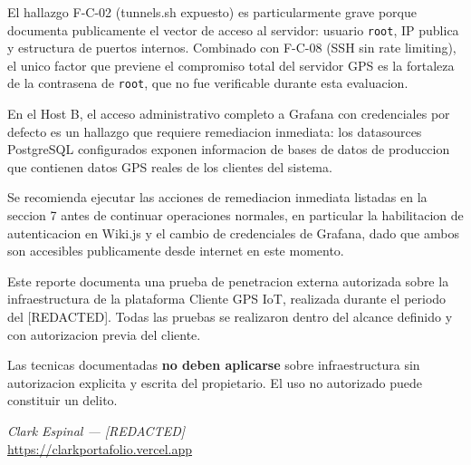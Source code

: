 \documentclass[11pt,a4paper]{article}
\begin{document}
El hallazgo F-C-02 (tunnels.sh expuesto) es particularmente grave porque
documenta publicamente el vector de acceso al servidor: usuario \texttt{root},
IP publica y estructura de puertos internos. Combinado con F-C-08 (SSH sin
rate limiting), el unico factor que previene el compromiso total del servidor
GPS es la fortaleza de la contrasena de \texttt{root}, que no fue verificable
durante esta evaluacion.

En el Host B, el acceso administrativo completo a Grafana con credenciales
por defecto es un hallazgo que requiere remediacion inmediata: los datasources
PostgreSQL configurados exponen informacion de bases de datos de produccion
que contienen datos GPS reales de los clientes del sistema.

Se recomienda ejecutar las acciones de remediacion inmediata listadas en la
seccion 7 antes de continuar operaciones normales, en particular la habilitacion
de autenticacion en Wiki.js y el cambio de credenciales de Grafana, dado que
ambos son accesibles publicamente desde internet en este momento.

\vspace{0.8cm}

\begin{tcolorbox}[colback=lightgray, colframe=bordercolor, boxrule=0.5pt, arc=3pt]
Este reporte documenta una prueba de penetracion externa autorizada sobre
la infraestructura de la plataforma Cliente GPS IoT, realizada durante el
periodo del [REDACTED]. Todas las pruebas se realizaron
dentro del alcance definido y con autorizacion previa del cliente.

Las tecnicas documentadas \textbf{no deben aplicarse} sobre infraestructura
sin autorizacion explicita y escrita del propietario. El uso no autorizado
puede constituir un delito.

\vspace{0.3cm}
\textit{Clark Espinal --- [REDACTED]}\\
\url{https://clarkportafolio.vercel.app}
\end{tcolorbox}
\end{document}
